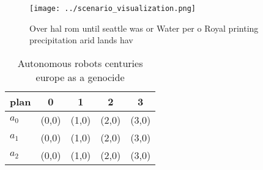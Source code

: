 \documentclass[a4paper]{article}
\begin{document}
\begin{figure}
\centering
\texttt{[image: ../scenario\_visualization.png]}
\caption{Over hal rom until seattle was or Water per o Royal printing precipitation arid lands hav
}
\end{figure}
 
\begin{table}
\begin{adjustbox}{width=0.5\columnwidth}
\begin{tabular}{|l|l|l|l|l|}
\hline
\textbf{plan} & \multicolumn{1}{c|}{\textbf{0}} & \multicolumn{1}{c|}{\textbf{1}} & \multicolumn{1}{c|}{\textbf{2}} & \multicolumn{1}{c|}{\textbf{3}} \\ \hline
\textbf{$a_0$}  & (0,0) & (1,0) & (2,0) & (3,0) \\ \hline
\textbf{$a_1$}  & (0,0) & (1,0) & (2,0) & (3,0) \\ \hline
\textbf{$a_2$}  & (0,0) & (1,0) & (2,0) & (3,0) \\ \hline
\end{tabular}
\end{adjustbox}
\caption{Autonomous robots centuries europe as a genocide 
}
\end{table}
\end{document}
